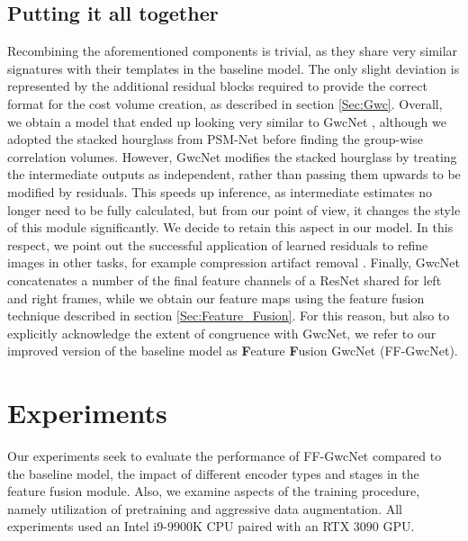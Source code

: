 \documentclass[runningheads]{llncs}
\begin{document}
\subsection{Putting it all together}
Recombining the aforementioned components is trivial, as they share very similar signatures with their templates in the baseline model. The only slight deviation is represented by the additional residual blocks required to provide the correct format for the cost volume creation, as described in section \ref{Sec:Gwc}. Overall, we obtain a model that ended up looking very similar to GwcNet \cite{guo2019groupwise}, although we adopted the stacked hourglass from PSM-Net \cite{PSM-Net} before finding the group-wise correlation volumes. However, GwcNet modifies the stacked hourglass by treating the intermediate outputs as independent, rather than passing them upwards to be modified by residuals. This speeds up inference, as intermediate estimates no longer need to be fully calculated, but from our point of view, it changes the style of this module significantly. We decide to retain this aspect in our model. In this respect, we point out the successful application of learned residuals to refine images in other tasks, for example compression artifact removal \cite{CompressionArtifactRemoval}. Finally, GwcNet concatenates a number of the final feature channels of a ResNet shared for left and right frames, while we obtain our feature maps using the feature fusion technique described in section \ref{Sec:Feature_Fusion}. For this reason, but also to explicitly acknowledge the extent of congruence with GwcNet, we refer to our improved version of the baseline model as \textbf{F}eature \textbf{F}usion GwcNet (FF-GwcNet).

\section{Experiments}
Our experiments seek to evaluate the performance of FF-GwcNet compared to the baseline model, the impact of different encoder types and stages in the feature fusion module. Also, we examine aspects of the training procedure, namely utilization of pretraining and aggressive data augmentation. All experiments used an Intel i9-9900K CPU paired with an RTX 3090 GPU.
\end{document}
